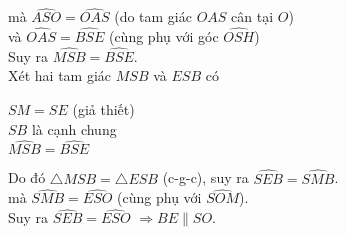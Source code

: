 \begin{bt}
{\begin{enumerate}
			mà $\widehat{ASO}=\widehat{OAS}$ (do tam giác $OAS$ cân tại $O$)\\
			và $\widehat{OAS}=\widehat{BSE}$ (cùng phụ với góc $\widehat{OSH}$)\\
			Suy ra $\widehat{MSB}=\widehat{BSE}$.\\
			Xét hai tam giác $MSB$ và $ESB$ có
			\begin{center}
				$SM=SE$ (giả thiết)\\
				$SB$ là cạnh chung\\
				$\widehat{MSB}=\widehat{BSE}$
			\end{center}
			Do đó $\triangle MSB=\triangle ESB$ (c-g-c), suy ra $\widehat{SEB}=\widehat{SMB}$.\\
			mà $\widehat{SMB}=\widehat{ESO}$ (cùng phụ với $\widehat{SOM}$).\\
			Suy ra $\widehat{SEB}=\widehat{ESO}$ $\Rightarrow BE\parallel SO$.
		\end{enumerate} 
	}
\end{bt}


